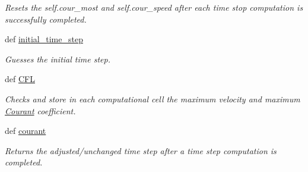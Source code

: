 \begin{DoxyCompactItemize}
\begin{DoxyCompactList}\small\item\em Resets the self.\-cour\-\_\-most and self.\-cour\-\_\-speed after each time stop computation is successfully completed. \end{DoxyCompactList}\item 
def \hyperlink{classsmoderp2d_1_1src_1_1courant_1_1Courant_ab69d95fbe66467f71b0a535be611f05b}{initial\-\_\-time\-\_\-step}
\begin{DoxyCompactList}\small\item\em Guesses the initial time step. \end{DoxyCompactList}\item 
\hypertarget{classsmoderp2d_1_1src_1_1courant_1_1Courant_a80d541950a9e78a273f8145e4ea76f3b}{def \hyperlink{classsmoderp2d_1_1src_1_1courant_1_1Courant_a80d541950a9e78a273f8145e4ea76f3b}{C\-F\-L}}\label{classsmoderp2d_1_1src_1_1courant_1_1Courant_a80d541950a9e78a273f8145e4ea76f3b}

\begin{DoxyCompactList}\small\item\em Checks and store in each computational cell the maximum velocity and maximum \hyperlink{classsmoderp2d_1_1src_1_1courant_1_1Courant}{Courant} coefficient. \end{DoxyCompactList}\item 
def \hyperlink{classsmoderp2d_1_1src_1_1courant_1_1Courant_a6a20926e1f36e2169eccdc27d92d787d}{courant}
\begin{DoxyCompactList}\small\item\em Returns the adjusted/unchanged time step after a time step computation is completed. \end{DoxyCompactList}\end{DoxyCompactItemize}
